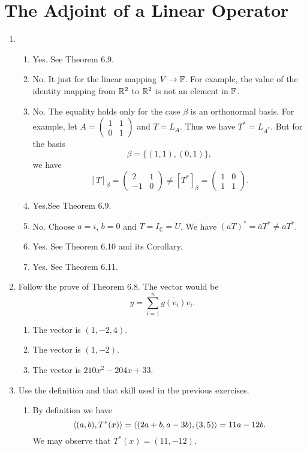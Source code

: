 \section{The Adjoint of a Linear Operator}
\begin{enumerate}
\item \begin{enumerate}
\item Yes. See Theorem 6.9.
\item No. It just for the linear mapping $V\rightarrow \mathbb{F}$. For example, the value of the identity mapping from $\mathbb{R}^2$ to $\mathbb{R}^2$ is not an element in $\mathbb{F}$.
\item No. The equality holds only for the case $\beta $ is an orthonormal basis. For example, let $A=\begin{pmatrix}1&1\\0&1\end{pmatrix}$ and $T=L_A$. Thus we have $T^*=L_{A^*}$. But for the basis 
\[\beta =\{(1,1),(0,1)\},\]
we have 
\[[T]_{\beta}=\begin{pmatrix}2&1\\-1&0\end{pmatrix}\neq [T^*]_{\beta}=\begin{pmatrix}1&0\\1&1\end{pmatrix}.\]
\item Yes.See Theorem 6.9.
\item No. Choose $a=i$, $b=0$ and $T=I_{\mathbb{C}}=U$. We have $(aT)^*=\overline{a}T^*\neq aT^*$.
\item Yes. See Theorem 6.10 and its Corollary.
\item Yes. See Theorem 6.11.
\end{enumerate}
\item Follow the prove of Theorem 6.8. The vector would be 
\[y=\sum_{i=1}^n{\overline{g(v_i)}v_i}.\]
\begin{enumerate}
\item The vector is $(1,-2,4)$.
\item The vector is $(1,-2)$.
\item The vector is $210x^2-204x+33$.
\end{enumerate}
\item Use the definition and that skill used in the previous exercises.
\begin{enumerate}
\item By definition we have 
\[\langle (a,b),T^*(x)\rangle =\langle (2a+b,a-3b),(3,5)\rangle =11a-12b.\]
We may observe that $T^*(x)=(11,-12)$.

\end{enumerate}
\end{enumerate}
